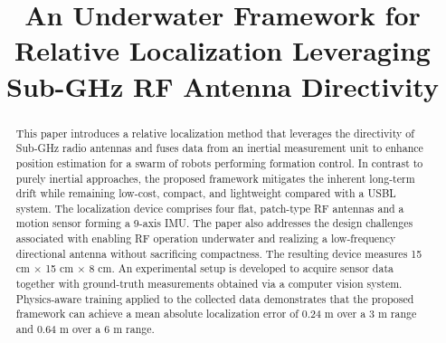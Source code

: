 \documentclass[subscriptcorrection,upint,varvw,barcolor=Goldenrod3,mathalfa=cal=euler,balance,hyphenate,pdf-a]{asmejour}
\begin{document}
\title{An Underwater Framework for Relative Localization Leveraging Sub-GHz RF Antenna Directivity}



\begin{abstract}
This paper introduces a relative localization method that leverages the directivity of Sub-GHz radio antennas and fuses data from an inertial measurement unit to enhance position estimation for a swarm of robots performing formation control. In contrast to purely inertial approaches, the proposed framework mitigates the inherent long-term drift while remaining low-cost, compact, and lightweight compared with a USBL system. The localization device comprises four flat, patch-type RF antennas and a motion sensor forming a 9-axis IMU. The paper also addresses the design challenges associated with enabling RF operation underwater and realizing a low-frequency directional antenna without sacrificing compactness. The resulting device measures 15 cm $\times$ 15 cm $\times$ 8 cm. An experimental setup is developed to acquire sensor data together with ground-truth measurements obtained via a computer vision system. Physics-aware training applied to the collected data demonstrates that the proposed framework can achieve a mean absolute localization error of 0.24 m over a 3 m range and 0.64 m over a 6 m range.
\end{abstract}


\maketitle
\end{document}
